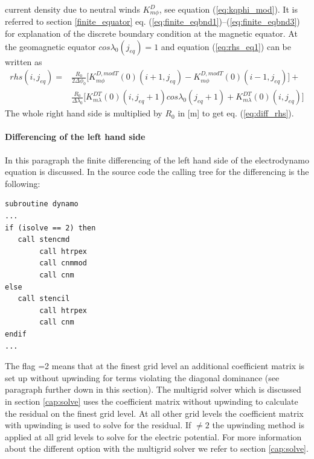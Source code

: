 current density due to neutral winds $K_{m \phi}^{D}$, see equation 
(\ref{eq:kqphi_mod}). It is referred to section \ref{finite_equator} 
eq. (\ref{eq:finite_eqbnd1})--(\ref{eq:finite_eqbnd3}) for explanation 
of the discrete boundary condition at the magnetic equator. 
At the geomagnetic equator $cos \lambda_0(j_{eq})=1$ and equation (\ref{eq:rhs_eq1}) 
can be written as
%
\begin{equation}
  \begin{split}
  rhs(i,j_{eq}) =& \frac{R_0}{ 2 \Delta \phi_0} \bigl[ K_{m \phi}^{D, mod T}(0)(i+1,j_{eq}) - 
      K_{m \phi}^{D, mod T}(0)(i-1,j_{eq})\bigr] + \\
     &\frac{R_0}{ \Delta \lambda_0 } \bigl[ K_{m \lambda }^{DT}(0)(i,j_{eq}+1) 
    cos \lambda_0(j_{eq}+1) + K_{m \lambda }^{DT}(0)(i,j_{eq} )\bigr]
  \end{split}
\end{equation}
%
The whole right hand side is multiplied by $R_0$ in [m] to get eq. (\ref{eq:diff_rhs}). 
%
\paragraph{Differencing of the left hand side}\label{page:diff_lhs}
%
In this paragraph the finite differencing of the left hand side of the electrodynamo
equation is
discussed. In the source code the calling tree for the differencing is the
following:
%
\begin{verbatim}
subroutine dynamo
...
if (isolve == 2) then
   call stencmd
        call htrpex
        call cnmmod
        call cnm
else
   call stencil
        call htrpex
        call cnm
endif
...
\end{verbatim}
%
The flag  =2 means that at the finest grid level an additional coefficient 
matrix is set up  without upwinding for terms violating
the diagonal dominance
(see paragraph further down in this section). The multigrid solver 
which is discussed in section \ref{cap:solve} uses the coefficient 
matrix without upwinding to calculate the residual on the finest
grid level. At all other grid levels the coefficient matrix 
with upwinding is used to solve for the 
residual. If  $ \neq 2$ the
upwinding method is applied at all grid levels to solve for the
electric potential. For more information
about the different option with the multigrid solver we refer to 
section \ref{cap:solve}. \\
 
